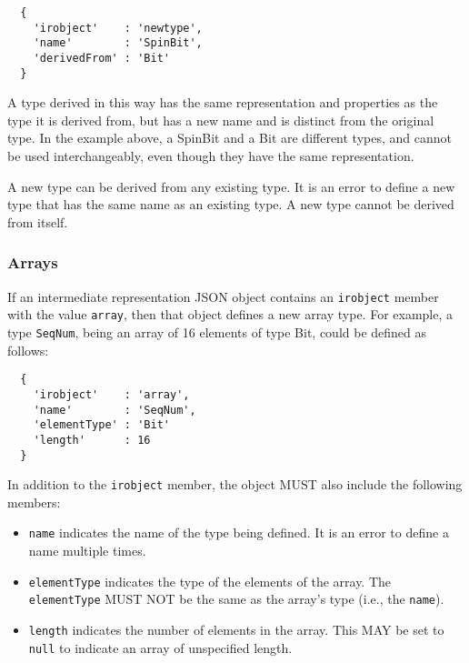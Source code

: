 \documentclass[twocolumn,a4paper]{article}
\begin{document}
\begin{verbatim}
  {
    'irobject'    : 'newtype',
    'name'        : 'SpinBit',
    'derivedFrom' : 'Bit'
  }
\end{verbatim}

A type derived in this way has the same representation and properties as
the type it is derived from, but has a new name and is distinct from the
original type.  In the example above, a SpinBit and a Bit are different
types, and cannot be used interchangeably, even though they have the same
representation.

A new type can be derived from any existing type. It is an error to define
a new type that has the same name as an existing type. A new type cannot be
derived from itself.

\subsubsection{Arrays}

If an intermediate representation JSON object contains an \texttt{irobject}
member with the value \texttt{array}, then that object defines a new array
type. For example, a type \texttt{SeqNum}, being an array of 16 elements of
type Bit, could be defined as follows:

\begin{verbatim}
  {
    'irobject'    : 'array',
    'name'        : 'SeqNum',
    'elementType' : 'Bit'
    'length'      : 16
  }
\end{verbatim}

In addition to the \texttt{irobject} member, the object MUST also include
the following members:
\begin{itemize}
  \item \texttt{name} indicates the name of the type being defined. It is
    an error to define a name multiple times.
  \item \texttt{elementType} indicates the type of the elements of the
    array. The \texttt{elementType} MUST NOT be the same as the array's
    type (i.e., the \texttt{name}).
  \item \texttt{length} indicates the number of elements in the array. This
    MAY be set to \texttt{null} to indicate an array of unspecified length.
\end{itemize}

\end{document}
